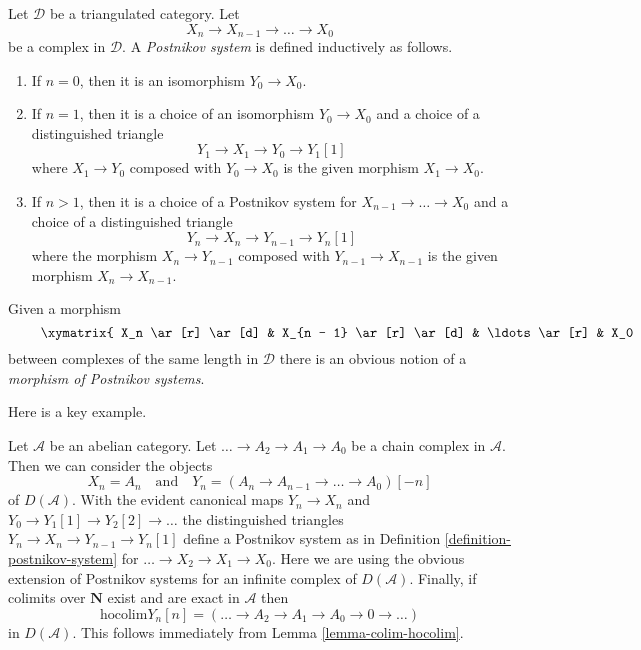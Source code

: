 \begin{definition}
\label{definition-postnikov-system}
Let $\mathcal{D}$ be a triangulated category. Let
$$
X_n \to X_{n - 1} \to \ldots \to X_0
$$
be a complex in $\mathcal{D}$. A {\it Postnikov system} is defined
inductively as follows.
\begin{enumerate}
\item If $n = 0$, then it is an isomorphism $Y_0 \to X_0$.
\item If $n = 1$, then it is a choice of an isomorphism $Y_0 \to X_0$ and
a choice of a distinguished triangle
$$
Y_1 \to X_1 \to Y_0 \to Y_1[1]
$$
where $X_1 \to Y_0$ composed with $Y_0 \to X_0$ is the given morphism
$X_1 \to X_0$.
\item If $n > 1$, then it is a choice of a Postnikov system
for $X_{n - 1} \to \ldots \to X_0$ and a choice of a distinguished
triangle
$$
Y_n \to X_n \to Y_{n - 1} \to Y_n[1]
$$
where the morphism $X_n \to Y_{n - 1}$ composed with
$Y_{n - 1} \to X_{n - 1}$ is the given morphism $X_n \to X_{n - 1}$.
\end{enumerate}
Given a morphism
\begin{equation}
\label{equation-map-complexes}
\vcenter{
\xymatrix{
X_n \ar[r] \ar[d] &
X_{n - 1} \ar[r] \ar[d] &
\ldots \ar[r] &
X_0 \ar[d] \\
X'_n \ar[r] &
X'_{n - 1} \ar[r] &
\ldots \ar[r] &
X'_0
}
}
\end{equation}
between complexes of the same length in $\mathcal{D}$
there is an obvious notion of a {\it morphism of Postnikov systems}.
\end{definition}

\noindent
Here is a key example.

\begin{example}
\label{example-key-postnikov}
Let $\mathcal{A}$ be an abelian category. Let $\ldots \to A_2 \to A_1 \to A_0$
be a chain complex in $\mathcal{A}$.
Then we can consider the objects
$$
X_n = A_n
\quad\text{and}\quad
Y_n = (A_n \to A_{n - 1} \to \ldots \to A_0)[-n]
$$
of $D(\mathcal{A})$. With the evident canonical maps $Y_n \to X_n$ and
$Y_0 \to Y_1[1] \to Y_2[2] \to \ldots$ the distinguished triangles
$Y_n \to X_n \to Y_{n - 1} \to Y_n[1]$ define a Postnikov system as in
Definition \ref{definition-postnikov-system} for
$\ldots \to X_2 \to X_1 \to X_0$. Here we are using the obvious
extension of Postnikov systems for an infinite complex of $D(\mathcal{A})$.
Finally, if colimits over $\mathbf{N}$ exist and are exact in $\mathcal{A}$
then
$$
\text{hocolim} Y_n[n] = (\ldots \to A_2 \to A_1 \to A_0 \to 0 \to \ldots)
$$
in $D(\mathcal{A})$. This follows immediately from
Lemma \ref{lemma-colim-hocolim}.
\end{example}

